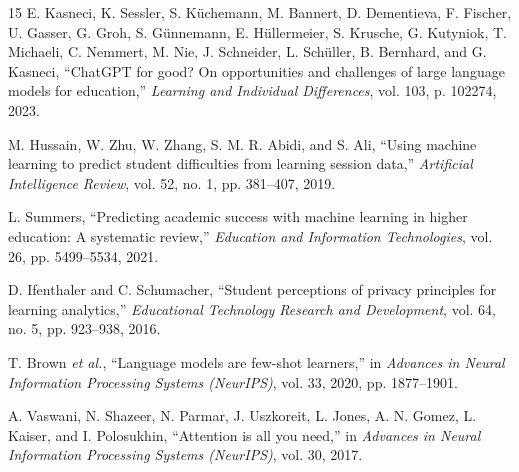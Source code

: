\documentclass[conference]{IEEEtran}
\begin{document}
\begin{thebibliography}{15}
E. Kasneci, K. Sessler, S. K\"{u}chemann, M. Bannert, D. Dementieva, F. Fischer, U. Gasser, G. Groh, S. G\"{u}nnemann, E. H\"{u}llermeier, S. Krusche, G. Kutyniok, T. Michaeli, C. Nemmert, M. Nie, J. Schneider, L. Sch\"{u}ller, B. Bernhard, and G. Kasneci, ``ChatGPT for good? On opportunities and challenges of large language models for education,'' \emph{Learning and Individual Differences}, vol. 103, p. 102274, 2023.

M. Hussain, W. Zhu, W. Zhang, S. M. R. Abidi, and S. Ali, ``Using machine learning to predict student difficulties from learning session data,'' \emph{Artificial Intelligence Review}, vol. 52, no. 1, pp. 381--407, 2019.

L. Summers, ``Predicting academic success with machine learning in higher education: A systematic review,'' \emph{Education and Information Technologies}, vol. 26, pp. 5499--5534, 2021.

D. Ifenthaler and C. Schumacher, ``Student perceptions of privacy principles for learning analytics,'' \emph{Educational Technology Research and Development}, vol. 64, no. 5, pp. 923--938, 2016.

T. Brown \emph{et al.}, ``Language models are few-shot learners,'' in \emph{Advances in Neural Information Processing Systems (NeurIPS)}, vol. 33, 2020, pp. 1877--1901.

A. Vaswani, N. Shazeer, N. Parmar, J. Uszkoreit, L. Jones, A. N. Gomez, L. Kaiser, and I. Polosukhin, ``Attention is all you need,'' in \emph{Advances in Neural Information Processing Systems (NeurIPS)}, vol. 30, 2017.

\end{thebibliography}
\end{document}
